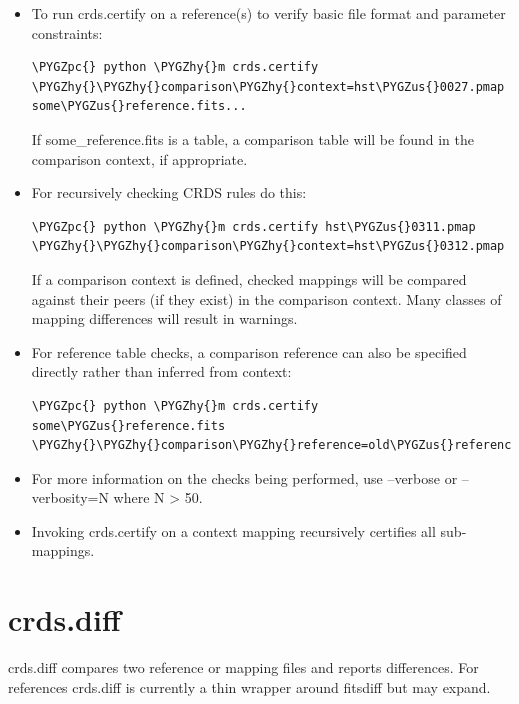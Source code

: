 \documentclass[letterpaper,10pt,english]{sphinxmanual}
\def\PYGZus{\char`\_}
\def\PYGZpc{\char`\%}
\def\PYGZhy{\char`\-}
\begin{document}
\begin{itemize}
\item {} 
To run crds.certify on a reference(s) to verify basic file format and parameter constraints:

\begin{Verbatim}[commandchars=\\\{\}]
\PYGZpc{} python \PYGZhy{}m crds.certify \PYGZhy{}\PYGZhy{}comparison\PYGZhy{}context=hst\PYGZus{}0027.pmap   some\PYGZus{}reference.fits...
\end{Verbatim}

If some\_reference.fits is a table,  a comparison table will be found in the comparison context, if appropriate.

\item {} 
For recursively checking CRDS rules do this:

\begin{Verbatim}[commandchars=\\\{\}]
\PYGZpc{} python \PYGZhy{}m crds.certify hst\PYGZus{}0311.pmap \PYGZhy{}\PYGZhy{}comparison\PYGZhy{}context=hst\PYGZus{}0312.pmap
\end{Verbatim}

If a comparison context is defined, checked mappings will be compared against their peers (if they exist) in
the comparison context.  Many classes of mapping differences will result in warnings.

\item {} 
For reference table checks,  a comparison reference can also be specified directly rather than inferred from context:

\begin{Verbatim}[commandchars=\\\{\}]
\PYGZpc{} python \PYGZhy{}m crds.certify some\PYGZus{}reference.fits \PYGZhy{}\PYGZhy{}comparison\PYGZhy{}reference=old\PYGZus{}reference\PYGZus{}version.fits
\end{Verbatim}

\item {} 
For more information on the checks being performed,  use --verbose or --verbosity=N where N \textgreater{} 50.

\item {} 
Invoking crds.certify on a context mapping recursively certifies all sub-mappings.

\end{itemize}


\section{crds.diff}
\label{command_line_tools:crds-diff}
crds.diff compares two reference or mapping files and reports differences.  For
references crds.diff is currently a thin wrapper around fitsdiff but may expand.
\end{document}
